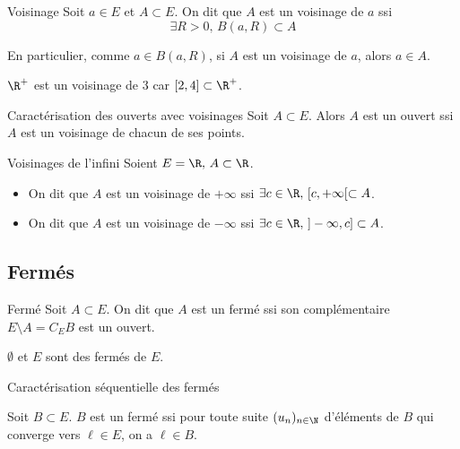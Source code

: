 \begin{definition}{Voisinage}{}
    Soit $a \in E$ et $A \subset E$. On dit que $A$ est un voisinage de $a$ ssi
    $$ \exists R > 0, \, B(a, R) \subset A$$
\end{definition}

\begin{remarque}
    En particulier, comme $a \in B(a, R)$, si $A$ est un voisinage de $a$, alors $a \in A$.
\end{remarque}


\begin{exemple}
    $\R^+$ est un voisinage de $3$ car $[2, 4] \subset \R^+$.
\end{exemple}

\begin{proposition}{Caractérisation des ouverts avec voisinages}{}
    Soit $A \subset E$. Alors $A$ est un ouvert ssi $A$ est un voisinage de chacun de ses points.
\end{proposition}

\begin{proposition}{Voisinages de l'infini}{}
    Soient $E = \R, \, A \subset \R$.
    \begin{itemize}
        \item On dit que $A$ est un voisinage de $+\infty$
        ssi $\exists c \in \R, \, [c, +\infty[ \subset A$. 

        \item On dit que $A$ est un voisinage de $-\infty$ ssi 
        $\exists c \in \R, \, ]-\infty, c] \subset A$.
    \end{itemize}
\end{proposition}

\subsection{Fermés}

\begin{definition}{Fermé}{}
    Soit $A \subset E$. On dit que $A$ est un fermé ssi son complémentaire 
    $E \setminus A = C_E B$ est un ouvert.
\end{definition}


\begin{exemple}
    $\emptyset$ et $E$ sont des fermés de $E$. 
\end{exemple}

\begin{theoreme}{Caractérisation séquentielle des fermés}{}

    Soit $B \subset E$. 
    $B$ est un fermé ssi pour toute suite $(u_n)_{n \in \N}$ d'éléments de $B$ qui converge 
    vers $\ell \in E$, on a $\ell \in B$.

\end{theoreme}

